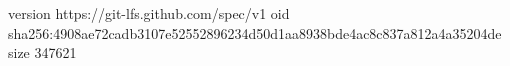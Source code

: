 version https://git-lfs.github.com/spec/v1
oid sha256:4908ae72cadb3107e52552896234d50d1aa8938bde4ac8c837a812a4a35204de
size 347621

